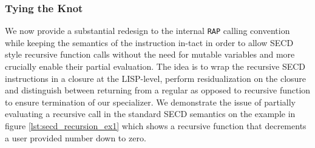 \documentclass{article}
\theoremstyle{definition}
\newcommand{\mslang}{$\lambda_{\uparrow\downarrow}$}
\begin{document}




\subsubsection{Tying the Knot}\label{ssubsec:knot}
We now provide a substantial redesign to the internal \texttt{RAP} calling convention while keeping the semantics of the instruction in-tact in order to allow SECD style recursive function calls without the need for mutable variables and more crucially enable their partial evaluation. The idea is to wrap the recursive SECD instructions in a closure at the LISP-level, perform residualization on the closure and distinguish between returning from a regular as opposed to recursive function to ensure termination of our specializer. We demonstrate the issue of partially evaluating a recursive call in the standard SECD semantics on the example in figure \ref{lst:secd_recursion_ex1} which shows a recursive function that decrements a user provided number down to zero.
\end{document}

